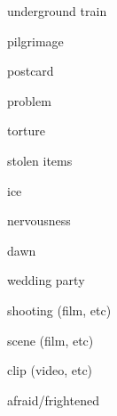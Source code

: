 \documentclass[avery5371,grid,frame]{flashcards}
\begin{document}
\begin{flashcard}{\LARGE underground train}
\LARGE {}
\end{flashcard}
\begin{flashcard}{\LARGE pilgrimage}
\LARGE {}
\end{flashcard}
\begin{flashcard}{\LARGE postcard}
\LARGE {}
\end{flashcard}
\begin{flashcard}{\LARGE problem}
\LARGE {}
\end{flashcard}
\begin{flashcard}{\LARGE torture}
\LARGE {}
\end{flashcard}
\begin{flashcard}{\LARGE stolen items}
\LARGE {}
\end{flashcard}
\begin{flashcard}{\LARGE ice}
\LARGE {}
\end{flashcard}
\begin{flashcard}{\LARGE nervousness}
\LARGE {}
\end{flashcard}
\begin{flashcard}{\LARGE dawn}
\LARGE {}
\end{flashcard}
\begin{flashcard}{\LARGE wedding party}
\LARGE {}
\end{flashcard}
\begin{flashcard}{\LARGE shooting (film, etc)}
\LARGE {}
\end{flashcard}
\begin{flashcard}{\LARGE scene (film, etc)}
\LARGE {}
\end{flashcard}
\begin{flashcard}{\LARGE clip (video, etc)}
\LARGE {}
\end{flashcard}
\begin{flashcard}{\LARGE afraid/frightened}
\LARGE {}
\end{flashcard}
\end{document}
